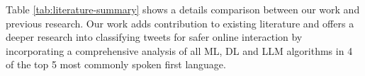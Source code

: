 Table \ref{tab:literature-summary} shows a details comparison between our work and previous research. Our work adds contribution to existing literature and offers a deeper research into classifying tweets for safer online interaction by incorporating a comprehensive analysis of all ML, DL and LLM algorithms in 4 of the top 5 most commonly spoken first language.